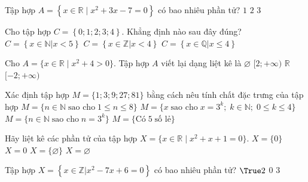 \begin{ex}%
	Tập hợp $A = \left\{x \in  \mathbb{R}\mid x^2+3x-7=0 \right\}$ có bao nhiêu phần tử?
		 {$1$}
		 {\True $2$}
		 {$3$}
\end{ex}

\begin{ex}%
	Cho tập hợp $C = \left\{0;1;2;3;4\right\}$.  Khẳng định nào sau đây đúng?
		{\True $C =  \left\{x \in \mathbb{N}\big|x < 5\right\}$}
		{$C = \left\{x \in \mathbb{Z}\big|x  < 4\right\}$}
		{$C  = \left\{x \in \mathbb{Q}\big|x \le 4\right\}$}
\end{ex}

\begin{ex}%
	 Cho $A=\{x \in \mathbb{R} \mid x^2+4 > 0\}$. Tập hợp $A$ viết lại dạng liệt kê là
	 \choice
		{$\varnothing$} 
		 {$[2;+\infty)$}
		{\True $\mathbb{R}$} 
		 {$[-2;+\infty)$}
\end{ex}

\begin{ex}%
	Xác định tập hợp $M=\{1;3;9;27;81\}$ bằng cách  nêu tính chất đặc trưng của tập hợp
	 \choice
		{  $M=\{ n \in \mathbb{N} \; \text{sao cho}\; 1\leq n \leq 8\}$}
		{\True $M=\{ x \; \text{sao cho}\; x=3^k;\; k \in  \mathbb{N};\; 0\leq k \leq 4\}$}
		{$M=\{ n  \in \mathbb{N} \; \text{sao cho}\; n =3^k\}$}
		 {$M=\{ \text{Có}\; 5\; \text{số lẻ}\}$}
\end{ex}

\begin{ex}%
	Hãy liệt kê các  phần tử của tập hợp $X=\{x \in \mathbb{R} \mid x^2+x+1=0\}$.
	 \choice
		 {$X=\{0\}$}
		 {$X=0$}
		 {$X=\{\varnothing\}$}
		 {\True $X=\varnothing$}
\end{ex}

\begin{ex}%
	 Tập hợp $X = \left\{x \in \mathbb{Z}\big|x^2 - 7x + 6 = 0\right\}$ có bao nhiêu phần tử?
		{$\True  2$}
		 {$0$}
		 {$3$}
\end{ex}

